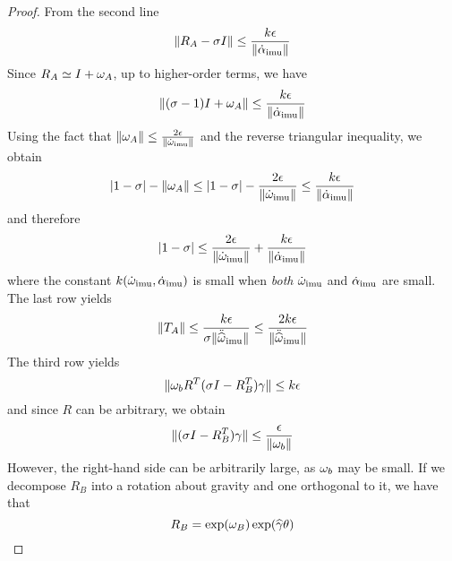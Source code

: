 \begin{proof}
From the second line
\begin{equation}
\| R_A - \sigma I \| \le \frac{k\epsilon}{\|\dot \alpha_\mathrm{imu}  \|}
\end{equation}
Since $R_A %
\simeq I + \w_A$, up to higher-order terms, we have 
\begin{equation}
\| (\sigma-1) I + \omega_A  \| \le \frac{k\epsilon}{\|\dot \alpha_\mathrm{imu}  \|}
\end{equation}
Using the fact that $\| \omega_A \| \le \frac{2\epsilon}{\| \dot {\omega}_\mathrm{imu} \|}$ and the reverse triangular inequality, we obtain
\begin{equation}
| 1 - \sigma| - \| \omega_A\| \le | 1 - \sigma | - \frac{2\epsilon}{\| \dot {\omega}_\mathrm{imu}  \|} \le \frac{k \epsilon}{\| \dot \alpha_\mathrm{imu} \|}
\end{equation}
and therefore
\begin{equation}
 |1 - \sigma| \le \frac{2\epsilon}{\| \dot \w\imu  \|} + \frac{k \epsilon}{\| \dot \alpha\imu \|} %
\end{equation}
where the constant $k(\dot {\omega}_\mathrm{imu} , \dot\alpha_\mathrm{imu} )$ is small when {\em both} $\dot {\omega}_\mathrm{imu} $ and $\dot \alpha_\mathrm{imu} $ are small.
The last row yields
\begin{equation}
\| T_A \| \le \frac{k \epsilon}{\sigma \| \ddot\hw\imu \|} \le \frac{2 k \epsilon}{ \| \ddot\hw\imu \|} %
\end{equation}
The third row yields
\begin{equation}
\| \omega_b R^T(\sigma I - R_B^T)\gamma \| \le k \epsilon
\end{equation}
and since $R$ can be arbitrary, we obtain
\begin{equation}
\| (\sigma I - R_B^T)\gamma \| \le \frac{\epsilon }{\| \omega_b \|}
\end{equation}
However, the right-hand side can be arbitrarily large, as $\omega_b$ may be small. If we decompose $R_B$ into a rotation about gravity and one orthogonal to it, we have that 
\begin{equation}
R_B = \exp(\w_B) \exp(\widehat \gamma \theta)

\end{equation}
\end{proof}
